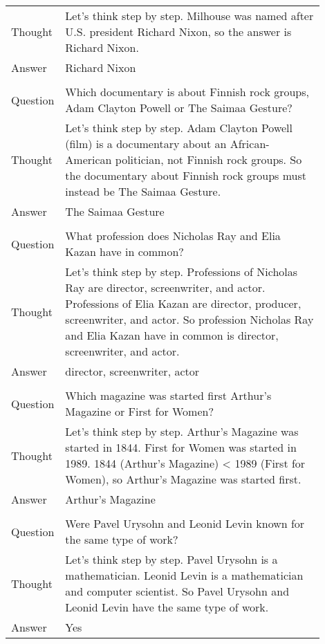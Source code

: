 \begin{table}[H]
\begin{minipage}{0.9\linewidth}
\begin{tabular}{l p{0.9\linewidth}}
Thought &  Let's think step by step. Milhouse was named after U.S. president Richard Nixon, so the answer is Richard Nixon.\\
Answer &  Richard Nixon\\
\\
Question &  Which documentary is about Finnish rock groups, Adam Clayton Powell or The Saimaa Gesture?\\
Thought &  Let's think step by step. Adam Clayton Powell (film) is a documentary about an African-American politician, not Finnish rock groups. So the documentary about Finnish rock groups must instead be The Saimaa Gesture.\\
Answer &  The Saimaa Gesture\\
\\
Question &  What profession does Nicholas Ray and Elia Kazan have in common?\\
Thought &  Let's think step by step. Professions of Nicholas Ray are director, screenwriter, and actor. Professions of Elia Kazan are director, producer, screenwriter, and actor. So profession Nicholas Ray and Elia Kazan have in common is director, screenwriter, and actor.\\
Answer &  director, screenwriter, actor\\
\\
Question &  Which magazine was started first Arthur's Magazine or First for Women?\\
Thought &  Let's think step by step. Arthur's Magazine was started in 1844. First for Women was started in 1989. 1844 (Arthur's Magazine) < 1989 (First for Women), so Arthur's Magazine was started first.\\
Answer &  Arthur's Magazine\\
\\
Question &  Were Pavel Urysohn and Leonid Levin known for the same type of work?\\
Thought &  Let's think step by step. Pavel Urysohn is a mathematician. Leonid Levin is a mathematician and computer scientist. So Pavel Urysohn and Leonid Levin have the same type of work.\\
Answer &  Yes\\



\end{tabular}
\end{minipage}
\end{table}

